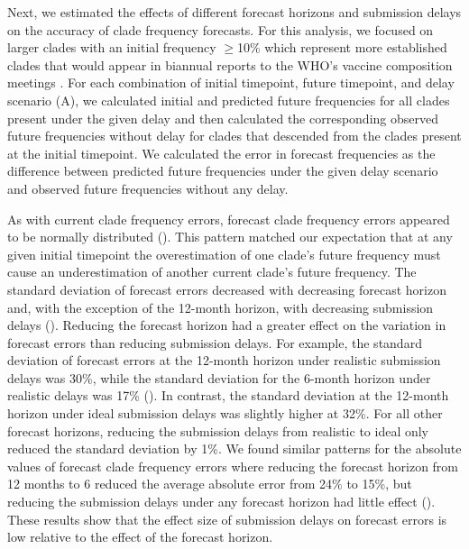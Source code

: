 \documentclass[9pt,lineno]{elife}
\begin{document}
Next, we estimated the effects of different forecast horizons and submission delays on the accuracy of clade frequency forecasts.
For this analysis, we focused on larger clades with an initial frequency $\ge$10\% which represent more established clades that would appear in biannual reports to the WHO's vaccine composition meetings \citep{Huddleston2024}.
For each combination of initial timepoint, future timepoint, and delay scenario (A), we calculated initial and predicted future frequencies for all clades present under the given delay and then calculated the corresponding observed future frequencies without delay for clades that descended from the clades present at the initial timepoint.
We calculated the error in forecast frequencies as the difference between predicted future frequencies under the given delay scenario and observed future frequencies without any delay.

As with current clade frequency errors, forecast clade frequency errors appeared to be normally distributed ().
This pattern matched our expectation that at any given initial timepoint the overestimation of one clade's future frequency must cause an underestimation of another current clade's future frequency.
The standard deviation of forecast errors decreased with decreasing forecast horizon and, with the exception of the 12-month horizon, with decreasing submission delays ().
Reducing the forecast horizon had a greater effect on the variation in forecast errors than reducing submission delays.
For example, the standard deviation of forecast errors at the 12-month horizon under realistic submission delays was 30\%, while the standard deviation for the 6-month horizon under realistic delays was 17\% ().
In contrast, the standard deviation at the 12-month horizon under ideal submission delays was slightly higher at 32\%.
For all other forecast horizons, reducing the submission delays from realistic to ideal only reduced the standard deviation by 1\%.
We found similar patterns for the absolute values of forecast clade frequency errors where reducing the forecast horizon from 12 months to 6 reduced the average absolute error from 24\% to 15\%, but reducing the submission delays under any forecast horizon had little effect ().
These results show that the effect size of submission delays on forecast errors is low relative to the effect of the forecast horizon.
\end{document}
